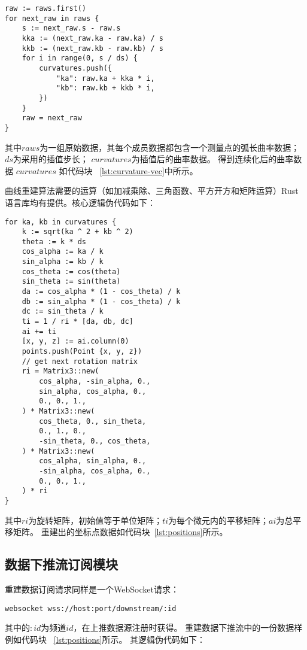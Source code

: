 \begin{lstlisting}[caption={线性插值法}]
raw := raws.first()
for next_raw in raws {
    s := next_raw.s - raw.s
    kka := (next_raw.ka - raw.ka) / s
    kkb := (next_raw.kb - raw.kb) / s
    for i in range(0, s / ds) {
        curvatures.push({
            "ka": raw.ka + kka * i, 
            "kb": raw.kb + kkb * i,
        })
    }
    raw = next_raw
}
\end{lstlisting}

其中$raws$为一组原始数据，其每个成员数据都包含一个测量点的弧长曲率数据；
$ds$为采用的插值步长；
$curvatures$为插值后的曲率数据。
得到连续化后的曲率数据 $curvatures$ 如代码块 ~\ref{lst:curvature-vec}中所示。

曲线重建算法需要的运算（如加减乘除、三角函数、平方开方和矩阵运算）Rust语言库均有提供。核心逻辑伪代码如下：

\begin{lstlisting}[caption={曲线重建}]
for ka, kb in curvatures {
    k := sqrt(ka ^ 2 + kb ^ 2)
    theta := k * ds
    cos_alpha := ka / k
    sin_alpha := kb / k
    cos_theta := cos(theta)
    sin_theta := sin(theta)
    da := cos_alpha * (1 - cos_theta) / k
    db := sin_alpha * (1 - cos_theta) / k
    dc := sin_theta / k
    ti = 1 / ri * [da, db, dc]
    ai += ti
    [x, y, z] := ai.column(0)
    points.push(Point {x, y, z})
    // get next rotation matrix
    ri = Matrix3::new(
        cos_alpha, -sin_alpha, 0.,
        sin_alpha, cos_alpha, 0.,
        0., 0., 1.,
    ) * Matrix3::new(
        cos_theta, 0., sin_theta,
        0., 1., 0.,
        -sin_theta, 0., cos_theta,
    ) * Matrix3::new(
        cos_alpha, sin_alpha, 0.,
        -sin_alpha, cos_alpha, 0.,
        0., 0., 1.,
    ) * ri
}
\end{lstlisting}

其中$ri$为旋转矩阵，初始值等于单位矩阵；$ti$为每个微元内的平移矩阵；$ai$为总平移矩阵。
重建出的坐标点数据如代码块~\ref{lst:positions}所示。

\subsection{数据下推流订阅模块}

重建数据订阅请求同样是一个WebSocket请求：

\begin{lstlisting}[label={lst:subscribe},caption={重建数据订阅}]
websocket wss://host:port/downstream/:id
\end{lstlisting}

其中的$:id$为频道$id$，在上推数据源注册时获得。
重建数据下推流中的一份数据样例如代码块 ~\ref{lst:positions}所示。
其逻辑伪代码如下：

